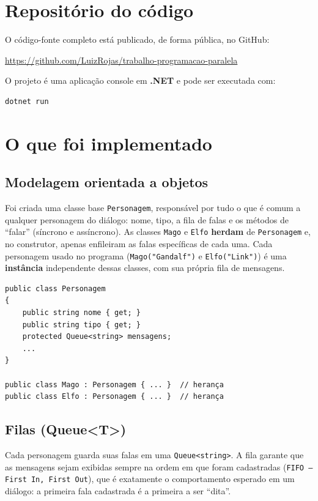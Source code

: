 \documentclass[12pt,a4paper]{article}
\begin{document}
\section{Repositório do código}

O código-fonte completo está publicado, de forma pública, no GitHub:

\begin{center}
  \url{https://github.com/LuizRojas/trabalho-programacao-paralela}
\end{center}

O projeto é uma aplicação console em \textbf{.NET} e pode ser executada com:

\begin{lstlisting}[language=bash,numbers=none]
dotnet run
\end{lstlisting}

\section{O que foi implementado}

\subsection{Modelagem orientada a objetos}

Foi criada uma classe base \texttt{Personagem}, responsável por tudo o que é comum
a qualquer personagem do diálogo: nome, tipo, a fila de falas e os métodos de
``falar'' (síncrono e assíncrono). As classes \texttt{Mago} e \texttt{Elfo} \textbf{herdam}
de \texttt{Personagem} e, no construtor, apenas enfileiram as falas específicas de
cada uma. Cada personagem usado no programa (\texttt{Mago("Gandalf")} e
\texttt{Elfo("Link")}) é uma \textbf{instância} independente dessas classes, com sua
própria fila de mensagens.

\begin{lstlisting}
public class Personagem
{
    public string nome { get; }
    public string tipo { get; }
    protected Queue<string> mensagens;
    ...
}

public class Mago : Personagem { ... }  // herança
public class Elfo : Personagem { ... }  // herança
\end{lstlisting}

\subsection{Filas (Queue<T>)}

Cada personagem guarda suas falas em uma \texttt{Queue<string>}. A fila garante que
as mensagens sejam exibidas sempre na ordem em que foram cadastradas
(\texttt{FIFO -- First In, First Out}), que é exatamente o comportamento esperado
em um diálogo: a primeira fala cadastrada é a primeira a ser ``dita''.
\end{document}
